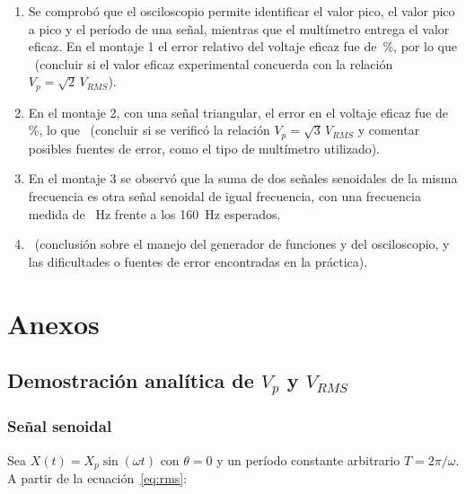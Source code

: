 \documentclass{article}
\newcommand{\vacio}[1][2cm]{\underline{\hspace{#1}}}
\begin{document}
    \begin{enumerate}
        \item Se comprobó que el osciloscopio permite identificar el valor pico, el valor pico a pico y el período de una señal, mientras que el multímetro entrega el valor eficaz. En el montaje 1 el error relativo del voltaje eficaz fue de \vacio\,\%, por lo que \vacio\ (concluir si el valor eficaz experimental concuerda con la relación $V_p = \sqrt{2}\,V_{RMS}$).

        \item En el montaje 2, con una señal triangular, el error en el voltaje eficaz fue de \vacio\,\%, lo que \vacio\ (concluir si se verificó la relación $V_p = \sqrt{3}\,V_{RMS}$ y comentar posibles fuentes de error, como el tipo de multímetro utilizado).

        \item En el montaje 3 se observó que la suma de dos señales senoidales de la misma frecuencia es otra señal senoidal de igual frecuencia, con una frecuencia medida de \vacio\ \si{\hertz} frente a los \SI{160}{\hertz} esperados.

        \item \vacio\ (conclusión sobre el manejo del generador de funciones y del osciloscopio, y las dificultades o fuentes de error encontradas en la práctica).
    \end{enumerate}

    \nocite{unah2026lie311p1}
    \printbibliography{}

    \newpage
    \section{Anexos}

    \subsection{Demostración analítica de $V_p$ y $V_{RMS}$}\label{anexo:demostracion}

    \subsubsection{Señal senoidal}

    Sea $X(t) = X_p\sin(\omega t)$ con $\theta = 0$ y un período constante arbitrario $T = 2\pi/\omega$. A partir de la ecuación~\eqref{eq:rms}:
\end{document}
